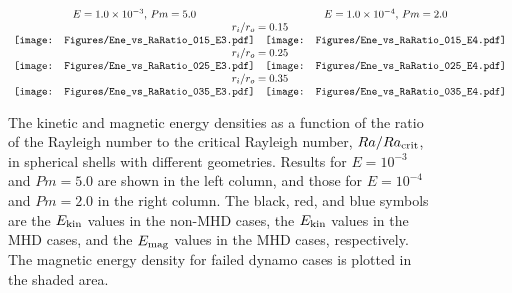\begin{figure*}
\begin{center}
\[
\begin{array}{ccc}
\mbox{$E = 1.0 \times 10^{-3}$, $Pm = 5.0$} &
\mbox{$E = 1.0 \times 10^{-4}$, $Pm = 2.0$} \\
\multicolumn{2}{c}{\mbox{$r_{i} / r_{o} = 0.15$}} \\
\texttt{[image: Figures/Ene\_vs\_RaRatio\_015\_E3.pdf]} &
\texttt{[image: Figures/Ene\_vs\_RaRatio\_015\_E4.pdf]} \\
\multicolumn{2}{c}{\mbox{$r_{i} / r_{o} = 0.25$}} \\
\texttt{[image: Figures/Ene\_vs\_RaRatio\_025\_E3.pdf]} &
\texttt{[image: Figures/Ene\_vs\_RaRatio\_025\_E4.pdf]} \\
\multicolumn{2}{c}{\mbox{$r_{i} / r_{o} = 0.35$}} \\
\texttt{[image: Figures/Ene\_vs\_RaRatio\_035\_E3.pdf]} &
\texttt{[image: Figures/Ene\_vs\_RaRatio\_035\_E4.pdf]}
\end{array}
\]
\end{center}
\caption{The kinetic and magnetic energy densities as a function of the ratio of the Rayleigh number to the critical Rayleigh number, $Ra / Ra_{\rm crit}$, in spherical shells with different geometries.
Results for $E = 10^{-3}$ and $Pm = 5.0$ are shown in the left column, and those for $E = 10^{-4}$ and $Pm = 2.0$ in the right column.
The black, red, and blue symbols are the $E_{\rm kin}$ values in the non-MHD cases, the $E_{\rm kin}$ values in the MHD cases, and the $E_{\rm mag}$ values in the MHD cases, respectively.
The magnetic energy density for failed dynamo cases is plotted in the shaded area. 
}
\label{fig:fig_3}
\end{figure*}